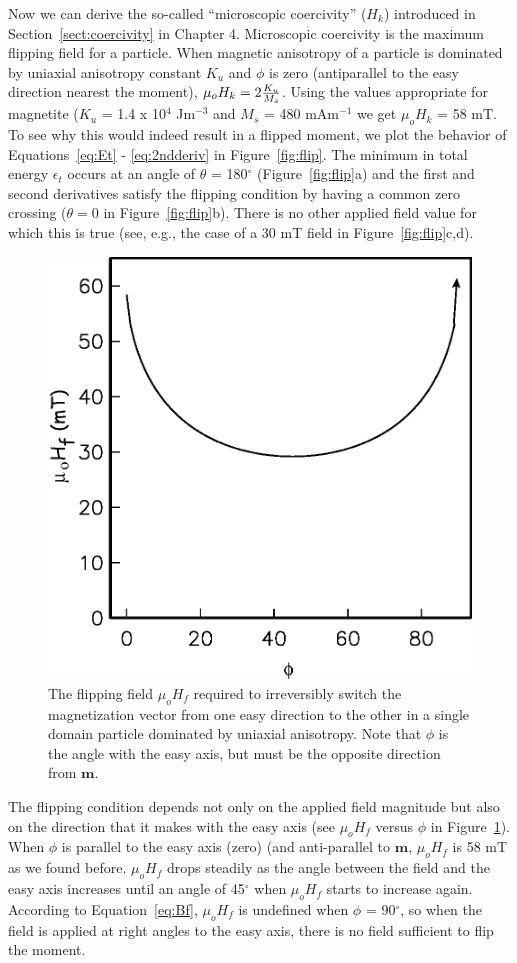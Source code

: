 Now we can derive  the so-called 
 ``microscopic coercivity'' ($H_k$)  introduced in  Section~\ref{sect:coercivity} in Chapter 4.  Microscopic coercivity is the maximum flipping field for a particle.    When  magnetic anisotropy  of a  particle is dominated by uniaxial anisotropy constant $K_u$ and $\phi$ is zero (antiparallel to the easy direction nearest the moment),   $\mu_o H_k = 2{ {K_u}\over {M_s} }$.     
Using the values appropriate for magnetite ($K_u$ = 1.4 x 10$^4$ Jm$^{-3}$ and $M_s$ = 480 mAm$^{-1}$ we get $\mu_o H_k$ = 58 mT.  To see why this would indeed result in a flipped moment, we plot the behavior of Equations~\ref{eq:Et} - \ref{eq:2ndderiv} in Figure~\ref{fig:flip}.  The minimum in total energy $\epsilon_t$ occurs at an angle of $\theta$ = 180$^{\circ}$ (Figure~\ref{fig:flip}a) and the first and second derivatives satisfy the flipping condition by having a common zero crossing ($\theta=0$ in Figure~\ref{fig:flip}b).   There is no other applied field value for which this is true (see, e.g., the case of  a 30 mT field in Figure~\ref{fig:flip}c,d). 

\begin{figure}[h!tb]
\centering  \includegraphics[width=7 cm]{EPSfiles/bf.eps}
\caption{The flipping field $\mu_oH_f$ required to irreversibly switch the magnetization vector from one easy direction to the other in a single domain particle dominated by uniaxial anisotropy. Note that $\phi$ is the angle with the easy axis, but must be the opposite direction from $\textbf{m}$.   }
\label{fig:bf}
\end{figure}


The flipping condition depends not only on the applied field magnitude but also on  the direction that it makes with the easy axis   (see $\mu_oH_f$ versus $\phi$ in Figure~\ref{fig:bf}).  When $\phi$ is parallel to the easy axis (zero) (and anti-parallel to $\textbf{m}$, $\mu_oH_f$ is  58 mT as we found before.  $\mu_oH_f$ drops steadily as the angle between the field and the easy axis increases until an angle of 45$^{\circ}$ when $\mu_oH_f$ starts to increase again.   According to Equation~\ref{eq:Bf}, $\mu_oH_f$ is undefined when $\phi$ = 90$^{\circ}$, so when the field is applied at right angles to the easy axis, there is no field sufficient to flip the moment. 


